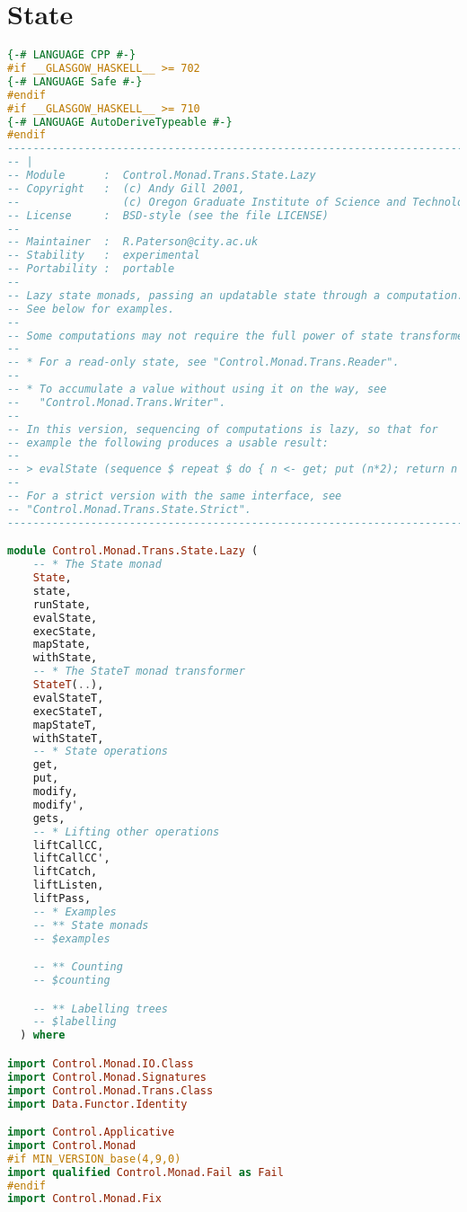 \section{State}
\begin{lstlisting}[language=Haskell]
{-# LANGUAGE CPP #-}
#if __GLASGOW_HASKELL__ >= 702
{-# LANGUAGE Safe #-}
#endif
#if __GLASGOW_HASKELL__ >= 710
{-# LANGUAGE AutoDeriveTypeable #-}
#endif
-----------------------------------------------------------------------------
-- |
-- Module      :  Control.Monad.Trans.State.Lazy
-- Copyright   :  (c) Andy Gill 2001,
--                (c) Oregon Graduate Institute of Science and Technology, 2001
-- License     :  BSD-style (see the file LICENSE)
--
-- Maintainer  :  R.Paterson@city.ac.uk
-- Stability   :  experimental
-- Portability :  portable
--
-- Lazy state monads, passing an updatable state through a computation.
-- See below for examples.
--
-- Some computations may not require the full power of state transformers:
--
-- * For a read-only state, see "Control.Monad.Trans.Reader".
--
-- * To accumulate a value without using it on the way, see
--   "Control.Monad.Trans.Writer".
--
-- In this version, sequencing of computations is lazy, so that for
-- example the following produces a usable result:
--
-- > evalState (sequence $ repeat $ do { n <- get; put (n*2); return n }) 1
--
-- For a strict version with the same interface, see
-- "Control.Monad.Trans.State.Strict".
-----------------------------------------------------------------------------

module Control.Monad.Trans.State.Lazy (
    -- * The State monad
    State,
    state,
    runState,
    evalState,
    execState,
    mapState,
    withState,
    -- * The StateT monad transformer
    StateT(..),
    evalStateT,
    execStateT,
    mapStateT,
    withStateT,
    -- * State operations
    get,
    put,
    modify,
    modify',
    gets,
    -- * Lifting other operations
    liftCallCC,
    liftCallCC',
    liftCatch,
    liftListen,
    liftPass,
    -- * Examples
    -- ** State monads
    -- $examples

    -- ** Counting
    -- $counting

    -- ** Labelling trees
    -- $labelling
  ) where

import Control.Monad.IO.Class
import Control.Monad.Signatures
import Control.Monad.Trans.Class
import Data.Functor.Identity

import Control.Applicative
import Control.Monad
#if MIN_VERSION_base(4,9,0)
import qualified Control.Monad.Fail as Fail
#endif
import Control.Monad.Fix


\end{lstlisting}
